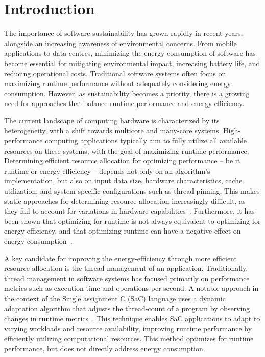 \section{Introduction}
The importance of software sustainability has grown rapidly in recent years, alongside an increasing
awareness of environmental concerns. From mobile applications to data centres, minimizing the energy
consumption of software has become essential for mitigating environmental impact, increasing battery
life, and reducing operational costs. Traditional software systems often focus on maximizing runtime
performance without adequately considering energy consumption. However, as sustainability becomes a
priority, there is a growing need for approaches that balance runtime performance and
energy-efficiency.

The current landscape of computing hardware is characterized by its heterogeneity, with a shift
towards multicore and many-core systems. High-perfor\-mance computing applications typically aim to
fully utilize all available resources on these systems, with the goal of maximizing runtime
performance. Determining efficient resource allocation for optimizing performance -- be it runtime
or energy-efficiency -- depends not only on an algorithm's implementation, but also on input data
size, hardware characteristics, cache utilization, and system-specific configurations such as thread
pinning. This makes static approaches for determining resource allocation increasingly difficult, as
they fail to account for variations in hardware capabilities~\cite{heterogeneous-systems}.
Furthermore, it has been shown that optimizing for runtime is not always equivalent to optimizing
for energy-efficiency, and that optimizing runtime can have a negative effect on energy
consumption~\cite{compiler-energy-android,compiler-energy-differences}.

A key candidate for improving the energy-efficiency through more efficient resource allocation is
the thread management of an application. Traditionally, thread management in software systems has
focused primarily on performance metrics such as execution time and operations per second. A notable
approach in the context of the Single assignment C (SaC) language uses a dynamic adaptation
algorithm that adjusts the thread-count of a program by observing changes in runtime
metrics~\cite{sac-mtdynamic}. This technique enables SaC applications to adapt to varying
workloads and resource availability, improving runtime performance by efficiently utilizing
computational resources. This method optimizes for runtime performance, but does not directly
address energy consumption.

